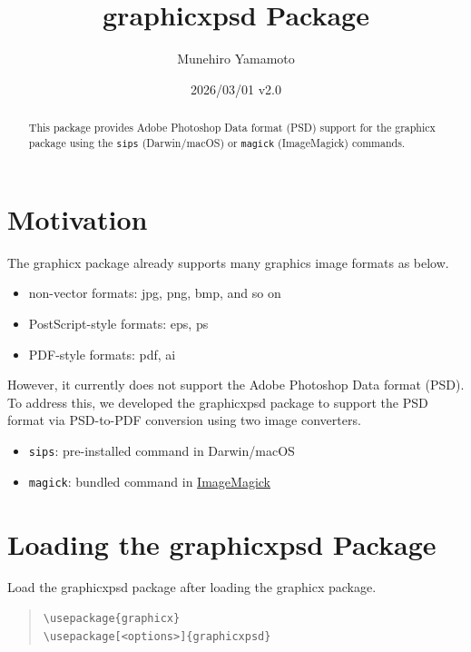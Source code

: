 \documentclass[luatex]{article}
\title{\textsf{graphicxpsd} Package}
\author{Munehiro Yamamoto}
\date{2026/03/01 v2.0}
\begin{document}
\maketitle
\begin{abstract}
This package provides Adobe Photoshop Data format (PSD) support
for the \textsf{graphicx} package
using the \texttt{sips} (Darwin/macOS) or \texttt{magick} (ImageMagick) commands.
\end{abstract}

\section{Motivation}
The \textsf{graphicx} package already supports many graphics image formats as below.
\begin{itemize}
\item non-vector formats: jpg, png, bmp, and so on
\item PostScript-style formats: eps, ps
\item PDF-style formats: pdf, ai
\end{itemize}
However, it currently does not support the Adobe Photoshop Data format (PSD).
To address this, we developed the \textsf{graphicxpsd} package
to support the PSD format via PSD-to-PDF conversion
using two image converters.
\begin{itemize}
\item \texttt{sips}:
pre-installed command in Darwin/macOS

\item \texttt{magick}:
bundled command in \href{https://www.imagemagick.org/}{ImageMagick}
\end{itemize}

\section{Loading the \textsf{graphicxpsd} Package}

Load the \textsf{graphicxpsd} package after loading the \textsf{graphicx} package.
\begin{quote}
\begin{verbatim}
\usepackage{graphicx}
\usepackage[<options>]{graphicxpsd}
\end{verbatim}
\end{quote}
\end{document}
